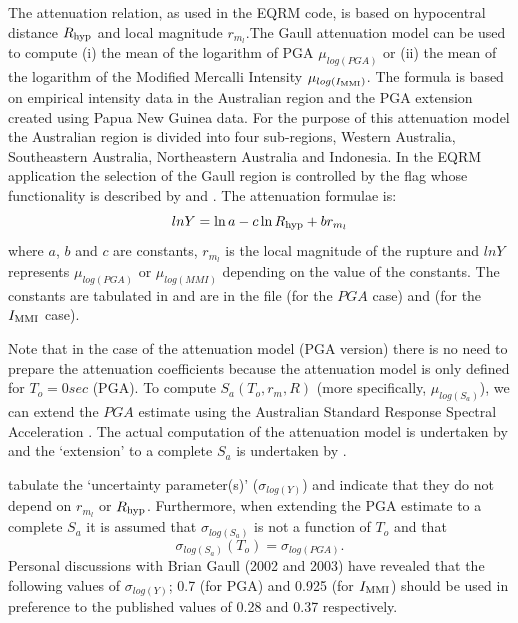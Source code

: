 The \citet{dr_Gaull90a} attenuation relation, as used in the EQRM
code, is based on hypocentral distance $\Rhyp$ and local magnitude
$r_{m_l}$.The Gaull attenuation model can be used to compute (i)
the mean of the logarithm of PGA $\mu_{log(PGA)}$ or (ii) the mean
of the logarithm of the Modified Mercalli Intensity
$\mu_{log(\Imm)}$. The formula is based on empirical intensity
data in the Australian region and the PGA extension created using
Papua New Guinea data. For the purpose of this attenuation model
the Australian region is divided into four sub-regions, Western
Australia, Southeastern Australia, Northeastern Australia and
Indonesia. In the EQRM application the selection of the Gaull
region is controlled by the flag  whose
functionality is described by  and
. The attenuation formulae is:
\begin{equation}
lnY = \ln a-c\ln \Rhyp + br_{m_l}
\end{equation}
where $a$, $b$ and $c$ are constants, $r_{m_l}$ is the local
magnitude of the rupture and $lnY$ represents $\mu_{log(PGA)}$ or
$\mu_{log(MMI)}$ depending on the value of the constants. The
constants are tabulated in \citet[Table 4]{dr_Gaull90a} and are in
the file  (for the $PGA$
case) and  (for the $\Imm$ case).

Note that in the case of the \citet{dr_Gaull90a} attenuation model
(PGA version) there is no need to prepare the attenuation
coefficients because the attenuation model is only defined for
$T_o=0 sec$ (PGA). To compute $S_a(T_o,r_m,R)$ (more specifically,
$\mu_{log(S_a)}$), we can extend the $PGA$ estimate using the
Australian Standard Response Spectral Acceleration
\citep{dr_Standards93a}. The actual computation of the
\citet{dr_Gaull90a} attenuation model is undertaken by
 and the `extension' to a
complete $S_a$ is undertaken by .

\citet[Table 4]{dr_Gaull90a} tabulate the `uncertainty
parameter(s)' ($\sigma_{log(Y)}$) and indicate that they do not
depend on $r_{m_l}$ or $\Rhyp$. Furthermore, when extending the
PGA estimate to a complete $S_a$ it is assumed that
$\sigma_{log(S_a)}$ is not a function of $T_o$ and that
\begin{equation}
\sigma_{log(S_a)}(T_o) = \sigma_{log(PGA)}.
\end{equation}
Personal discussions with Brian Gaull (2002 and 2003) have
revealed that the following values of $\sigma_{log(Y)}$; 0.7 (for
PGA) and 0.925 (for $\Imm$) should be used in preference to the
published values of 0.28 and 0.37 respectively.


